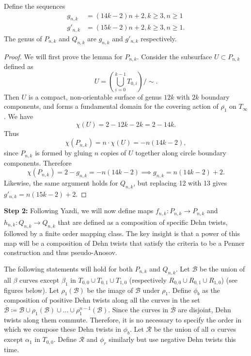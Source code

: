 \begin{lem}
Define the sequences
\begin{align}
    g_{n,k} &= (14k - 2)n + 2, k \geq 3, n \geq 1 \\
    g'_{n,k} &= (15k - 2)n + 2, k \geq 3, n \geq 1.
\end{align}
    The genus of $P_{n,k}$ and $Q_{n,k}$ are $g_{n,k}$ and $g'_{n,k}$ respectively.
\end{lem}
\begin{proof}
    We will first prove the lemma for $P_{n,k}$. Consider the subsurface $U \subset P_{n,k}$ defined as $$U = \left( \bigcup_{i =0}^{k-1} T_{0,i} \right)/\sim.$$ Then $U$ is a compact, non-orientable surface of genus $12k$ with $2k$ boundary components, and forms a fundamental domain for the covering action of $\overline{\rho_1}$ on $T_\infty$. We have $$\chi(U) = 2 - 12k - 2k = 2 - 14k.$$ Thus $$\chi(P_{n,k}) = n \cdot \chi(U) = -n(14k - 2),$$ since $P_{n,k}$ is formed by gluing $n$ copies of $U$ together along circle boundary components. Therefore $$\chi(P_{n,k}) = 2 - g_{n,k} = -n(14k - 2) \implies g_{n,k} = n(14k - 2) + 2.$$ Likewise, the same argument holds for $Q_{n,k}$, but replacing 12 with 13 gives $g'_{n,k} = n(15k - 2) + 2$.
\end{proof}


\textbf{Step 2:} Following Yazdi, we will now define maps $f_{n,k}: P_{n,k} \xrightarrow[]{} P_{n,k}$ and $h_{n,k}: Q_{n,k} \xrightarrow[]{} Q_{n,k}$ that are defined as a composition of specific Dehn twists, followed by a finite order mapping class. The key insight is that a power of this map will be a composition of Dehn twists that satisfy the criteria to be a Penner construction and thus pseudo-Anosov.

The following statements will hold for both $P_{n,k}$ and $Q_{n,k}$. Let $\mathcal{B}$ be the union of all $\beta$ curves except $\beta_1$ in $T_{0,0} \cup T_{0,1} \cup T_{1,0}$ (respectively $R_{0,0} \cup R_{0,1} \cup R_{1,0}$) (see figures below). Let $\rho_1(\mathcal{B})$ be the image of $\mathcal{B}$ under $\rho_1$. Define $\phi_b$ as the composition of positive Dehn twists along all the curves in the set $\overline{\mathcal{B}} \coloneqq \mathcal{B} \cup \rho_1(\mathcal{B}) \cup \dots \cup \rho_1^{n-1}(\mathcal{B})$. Since the curves in $\overline{\mathcal{B}}$ are disjoint, Dehn twists along them commute. Therefore, it is no necessary to specify the order in which we compose these Dehn twists in $\phi_b$. Let $\mathcal{R}$ be the union of all $\alpha$ curves except $\alpha_1$ in $T_{0,0}$. Define $\mathcal{R}$ and $\phi_r$ similarly but use negative Dehn twists this time.

